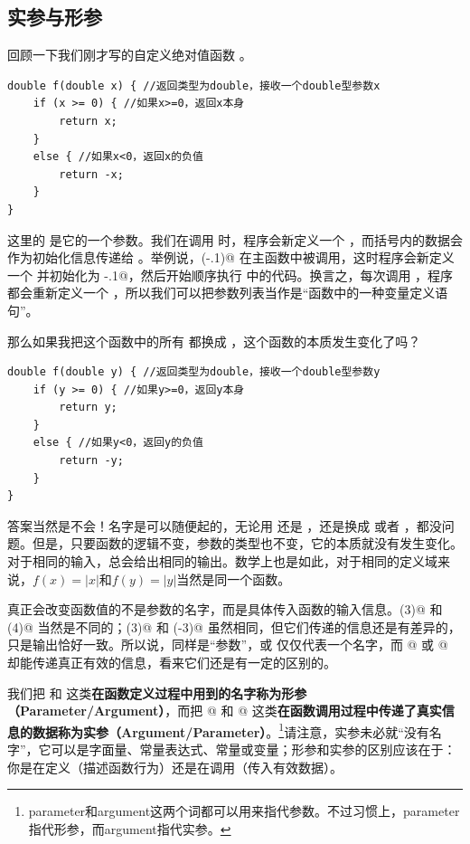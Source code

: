 \subsection*{实参与形参}
回顾一下我们刚才写的自定义绝对值函数 \lstinline@f@ 。
\begin{lstlisting}
double f(double x) { //返回类型为double，接收一个double型参数x
    if (x >= 0) { //如果x>=0，返回x本身
        return x;
    }
    else { //如果x<0，返回x的负值
        return -x;
    }
}
\end{lstlisting}
这里的 \lstinline@x@ 是它的一个参数。我们在调用 \lstinline@f@ 时，程序会新定义一个 \lstinline@x@，而括号内的数据会作为初始化信息传递给 \lstinline@x@。举例说，\lstinline@f(-.1)@ 在主函数中被调用，这时程序会新定义一个 \lstinline@x@ 并初始化为 \lstinline@-.1@，然后开始顺序执行 \lstinline@f@ 中的代码。换言之，每次调用 \lstinline@f@，程序都会重新定义一个 \lstinline@x@，所以我们可以把参数列表当作是``函数中的一种变量定义语句''。\par
那么如果我把这个函数中的所有 \lstinline@x@ 都换成 \lstinline@y@，这个函数的本质发生变化了吗？
\begin{lstlisting}
double f(double y) { //返回类型为double，接收一个double型参数y
    if (y >= 0) { //如果y>=0，返回y本身
        return y;
    }
    else { //如果y<0，返回y的负值
        return -y;
    }
}
\end{lstlisting}
答案当然是不会！名字是可以随便起的，无论用 \lstinline@x@ 还是 \lstinline@y@，还是换成 \lstinline@num@ 或者 \lstinline@arg@，都没问题。但是，只要函数的逻辑不变，参数的类型也不变，它的本质就没有发生变化。对于相同的输入，总会给出相同的输出。数学上也是如此，对于相同的定义域来说，$f(x)=\left|x\right|$和$f(y)=\left|y\right|$当然是同一个函数。\par
真正会改变函数值的不是参数的名字，而是具体传入函数的输入信息。\lstinline@f(3)@ 和 \lstinline@f(4)@ 当然是不同的；\lstinline@f(3)@ 和 \lstinline@f(-3)@ 虽然相同，但它们传递的信息还是有差异的，只是输出恰好一致。所以说，同样是``参数''，\lstinline@x@ 或 \lstinline@y@ 仅仅代表一个名字，而 @ 或 @ 却能传递真正有效的信息，看来它们还是有一定的区别的。\par
我们把 \lstinline@x@ 和 \lstinline@y@ 这类\textbf{在函数定义过程中用到的名字称为形参（Parameter/Argument）}，而把 @ 和 @ 这类\textbf{在函数调用过程中传递了真实信息的数据称为实参（Argument/Parameter）}。\footnote{parameter和argument这两个词都可以用来指代参数。不过习惯上，parameter指代形参，而argument指代实参。}请注意，实参未必就``没有名字''，它可以是字面量、常量表达式、常量或变量；形参和实参的区别应该在于：你是在定义（描述函数行为）还是在调用（传入有效数据）。\par
